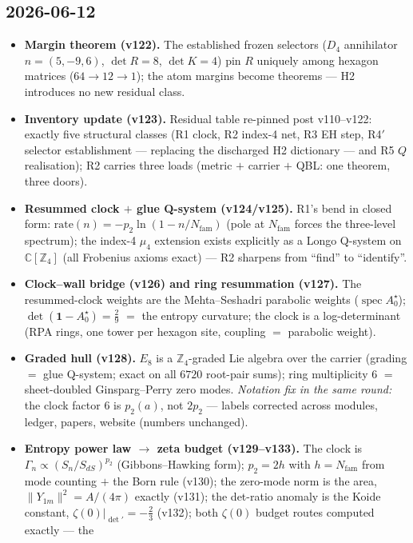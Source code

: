 \subsection*{2026-06-12}
\begin{itemize}
\item \textbf{Margin theorem (v122).} The established frozen selectors ($D_4$ annihilator
  $n=(5,-9,6)$, $\det R=8$, $\det K=4$) pin $R$ uniquely among hexagon matrices
  ($64\to12\to1$); the atom margins become theorems --- H2 introduces no new residual class.
\item \textbf{Inventory update (v123).} Residual table re-pinned post v110--v122: exactly five
  structural classes (R1 clock, R2 index-4 net, R3 EH step, R4$'$ selector establishment ---
  replacing the discharged H2 dictionary --- and R5 $Q$ realisation); R2 carries three loads
  (metric $+$ carrier $+$ QBL: one theorem, three doors).
\item \textbf{Resummed clock $+$ glue Q-system (v124/v125).} R1's bend in closed form:
  $\mathrm{rate}(n)=-p_2\ln(1-n/N_{\mathrm{fam}})$ (pole at $N_{\mathrm{fam}}$ forces the
  three-level spectrum); the index-4 $\mu_4$ extension exists explicitly as a Longo Q-system
  on $\mathbb C[\mathbb Z_4]$ (all Frobenius axioms exact) --- R2 sharpens from ``find'' to
  ``identify''.
\item \textbf{Clock--wall bridge (v126) and ring resummation (v127).} The resummed-clock
  weights are the Mehta--Seshadri parabolic weights ($\operatorname{spec}A_0^\star$);
  $\det(\mathbf 1-A_0^\star)=\tfrac29$ $=$ the entropy curvature; the clock is a
  log-determinant (RPA rings, one tower per hexagon site, coupling $=$ parabolic weight).
\item \textbf{Graded hull (v128).} $E_8$ is a $\mathbb Z_4$-graded Lie algebra over the
  carrier (grading $=$ glue Q-system; exact on all $6720$ root-pair sums); ring multiplicity
  $6$ $=$ sheet-doubled Ginsparg--Perry zero modes. \emph{Notation fix in the same round:}
  the clock factor $6$ is $p_2(a)$, not $2p_2$ --- labels corrected across modules, ledger,
  papers, website (numbers unchanged).
\item \textbf{Entropy power law $\to$ zeta budget (v129--v133).} The clock is
  $\Gamma_n\propto(S_n/S_{dS})^{p_2}$ (Gibbons--Hawking form); $p_2=2h$ with
  $h=N_{\mathrm{fam}}$ from mode counting $+$ the Born rule (v130); the zero-mode norm is the
  area, $\|Y_{1m}\|^2=A/(4\pi)$ exactly (v131); the det-ratio anomaly is the Koide constant,
  $\zeta(0)|_{\det'}=-\tfrac23$ (v132); both $\zeta(0)$ budget routes computed exactly --- the

\end{itemize}

